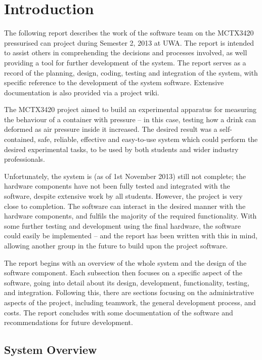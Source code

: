 \chapter{Introduction}

The following report describes the work of the software team on the MCTX3420 pressurised can project during Semester 2, 2013 at UWA. The report is intended to assist others in comprehending the decisions and processes involved, as well providing a tool for further development of the system. The report serves as a record of the planning, design, coding, testing and integration of the system, with specific reference to the development of the system software. Extensive documentation is also provided via a project wiki\cite{mctx3420_wiki}.

The MCTX3420 project aimed to build an experimental apparatus for measuring the behaviour of a container with pressure – in this case, testing how a drink can deformed as air pressure inside it increased. The desired result was a self-contained, safe, reliable, effective and easy-to-use system which could perform the desired experimental tasks, to be used by both students and wider industry professionals.

Unfortunately, the system is (as of 1st November 2013) still not complete; the hardware components have not been fully tested and integrated with the software, despite extensive work by all students. However, the project is very close to completion. The software can interact in the desired manner with the hardware components, and fulfils the majority of the required functionality. With some further testing and development using the final hardware, the software could easily be implemented – and the report has been written with this in mind, allowing another group in the future to build upon the project software.

The report begins with an overview of the whole system and the design of the software component. Each subsection then focuses on a specific aspect of the software, going into detail about its design, development, functionality, testing, and integration. Following this, there are sections focusing on the administrative aspects of the project, including teamwork, the general development process, and costs. The report concludes with some documentation of the software and recommendations for future development.

\section{System Overview}

